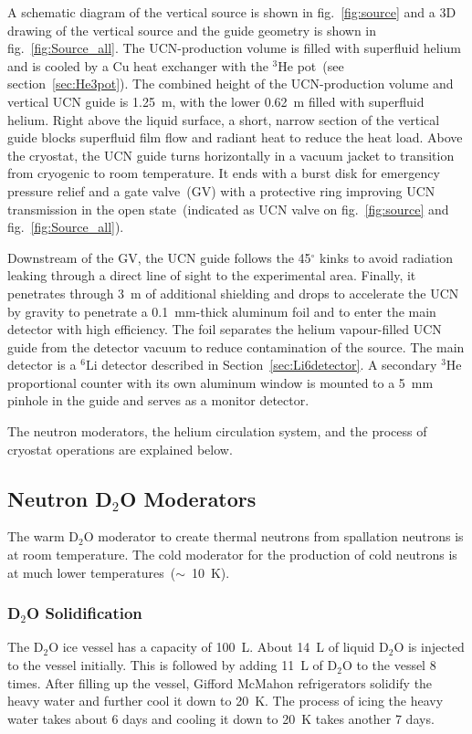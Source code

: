 A schematic diagram of the vertical source is shown in
fig.~\ref{fig:source} and a 3D drawing of the vertical source and the
guide geometry is shown in fig.~\ref{fig:Source_all}. The
UCN-production volume is filled with superfluid helium and is cooled
by a Cu heat exchanger with the $^3$He pot~(see
section~\ref{sec:He3pot}). The combined height of the UCN-production
volume and vertical UCN guide is 1.25~m, with the lower 0.62~m filled
with superfluid helium. Right above the liquid surface, a short,
narrow section of the vertical guide blocks superfluid film flow and
radiant heat to reduce the heat load. Above the cryostat, the UCN
guide turns horizontally in a vacuum jacket to transition from
cryogenic to room temperature. It ends with a burst disk for emergency
pressure relief and a gate valve~(GV) with a protective ring improving
UCN transmission in the open state~(indicated as UCN valve on
fig.~\ref{fig:source} and fig.~\ref{fig:Source_all}).

Downstream of the GV, the UCN guide follows the 45$^\circ$ kinks to
avoid radiation leaking through a direct line of sight to the
experimental area. Finally, it penetrates through 3~m of additional
shielding and drops to accelerate the UCN by gravity to penetrate a
0.1~mm-thick aluminum foil and to enter the main detector with high
efficiency. The foil separates the helium vapour-filled UCN guide from
the detector vacuum to reduce contamination of the source. The main
detector is a $^6$Li detector described in
Section~\ref{sec:Li6detector}. A secondary $^3$He proportional counter
with its own aluminum window is mounted to a 5~mm pinhole in the guide
and serves as a monitor detector.




The neutron moderators, the helium circulation system, and the process
of cryostat operations are explained below.


\subsection{Neutron D$_2$O Moderators}
The warm D$_2$O moderator to create thermal neutrons from spallation
neutrons is at room temperature. The cold moderator for the production
of cold neutrons is at much lower temperatures~($\sim$~10~K).

\subsubsection{D$_2$O Solidification}
The D$_2$O ice vessel has a capacity of 100~L. About 14~L of liquid
D$_2$O is injected to the vessel initially. This is followed by adding
11~L of D$_2$O to the vessel 8 times.  After filling up the vessel,
Gifford McMahon refrigerators solidify the heavy water and further
cool it down to 20~K. The process of icing the heavy water takes about
6 days and cooling it down to 20~K takes another 7 days.


